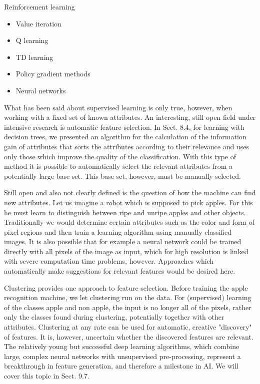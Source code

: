 \documentclass[10pt]{book}
\begin{document}
Reinforcement learning

\begin{itemize}
  \item Value iteration
  \item Q learning
  \item TD learning
  \item Policy gradient methods
  \item Neural networks
\end{itemize}

What has been said about supervised learning is only true, however, when working with a fixed set of known attributes. An interesting, still open field under intensive research is automatic feature selection. In Sect. 8.4, for learning with decision trees, we presented an algorithm for the calculation of the information gain of attributes that sorts the attributes according to their relevance and uses only those which improve the quality of the classification. With this type of method it is possible to automatically select the relevant attributes from a potentially large base set. This base set, however, must be manually selected.

Still open and also not clearly defined is the question of how the machine can find new attributes. Let us imagine a robot which is supposed to pick apples. For this he must learn to distinguish between ripe and unripe apples and other objects. Traditionally we would determine certain attributes such as the color and form of pixel regions and then train a learning algorithm using manually classified images. It is also possible that for example a neural network could be trained directly with all pixels of the image as input, which for high resolution is linked with severe computation time problems, however. Approaches which automatically make suggestions for relevant features would be desired here.


Clustering provides one approach to feature selection. Before training the apple recognition machine, we let clustering run on the data. For (supervised) learning of the classes apple and non apple, the input is no longer all of the pixels, rather only the classes found during clustering, potentially together with other attributes. Clustering at any rate can be used for automatic, creative "discovery" of features. It is, however, uncertain whether the discovered features are relevant. The relatively young but successful deep learning algorithms, which combine large, complex neural networks with unsupervised pre-processing, represent a breakthrough in feature generation, and therefore a milestone in AI. We will cover this topic in Sect. 9.7.
\end{document}
